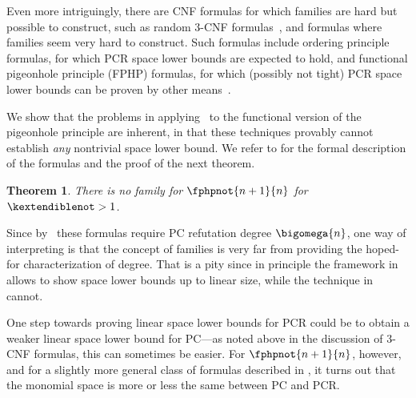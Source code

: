 \documentclass[11pt]{article}
\numberwithin{equation}{section}
\newtheorem{theorem}{Theorem}[section]
\theoremstyle{definition}
\theoremstyle{plain}
\begin{document}
Even more intriguingly, there are CNF formulas for which
\kextendibleNok families are hard but possible to construct, such as
random $3$-CNF formulas~\cite{BBGHMW17SpaceProofCplx}, and formulas
where \kextendibleNok families seem very hard to construct. Such
formulas include ordering principle formulas, for which PCR space
lower bounds are expected to hold, and functional pigeonhole principle
(FPHP) formulas, for which (possibly not tight) PCR space lower bounds
can be proven by other means~\cite{GKT19SpaceWidth}.

We show that the problems in applying~%
\cite{BG15Framework}
to the functional version of the pigeonhole principle are inherent, 
in that these techniques provably cannot establish
%
\emph{any} nontrivial
space lower bound.
%
We refer to
%
  for the formal description of the formulas
  and
%
%
%
  the proof of the 
  next theorem.

\begin{theorem}
  \label{th:no-kextendible}
  There is no \kextendible family for
  $\fphpnot{n+1}{n}$ 
%
  for
  $\kextendiblenot>1$. 
\end{theorem}
  
%
%
%
%
%
%
%
%
%
%
%
%
%
%
%
%
%
%
%
%
%
%
%
%
%
%
%
%
%
%
%

Since by~\cite{Razborov98LowerBound,MN15GeneralizedMethodDegree}
these formulas
require PC refutation
degree $\bigomega{n}$, one way of interpreting
 is that the concept of \kextendible families
is very far from providing the hoped-for characterization of degree.
%
That is a pity since in principle the framework
in~\cite{BG15Framework} allows to show space lower bounds up to linear
size, while the technique in~\cite{GKT19SpaceWidth} cannot.

One step towards proving linear space lower bounds for PCR could be to
obtain a weaker linear space lower bound for PC---as noted above in
the discussion of \mbox{$3$-CNF} formulas, this can sometimes
be easier.
%
For
$\fphpnot{n+1}{n}$,
%
however,
and for a slightly more general class of formulas
described in
 ,
%
%
%
%
it turns out that the monomial space is more or less the same
between PC and PCR.

%

\end{document}
